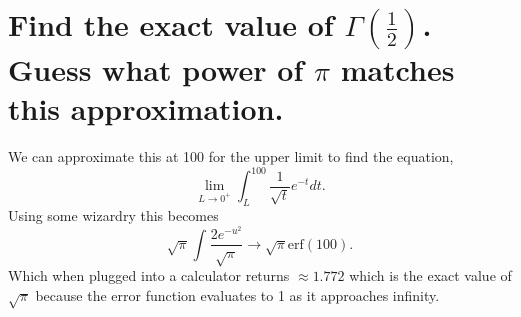 \section{Find the exact value of $\Gamma\left( \frac{1}{2} \right) $. Guess what power of $\pi$ matches this approximation.}%
We can approximate this at 100 for the upper limit to find the equation,
\[
  \lim_{L \to 0^{+}} \int_{L}^{100} \frac{1}{\sqrt{t}}e^{-t}dt
.\] 
Using some wizardry this becomes 
\[
\sqrt{\pi^{}}\int_{}^{} \frac{2e^{-u^2}}{\sqrt{\pi}} \to \sqrt{\pi}\text{erf}\left( 100\right) 
.\] 
Which when plugged into a calculator returns $\approx 1.772$ which is the exact value of $\sqrt{\pi}$ because the error function evaluates to 1 as it approaches infinity. 
